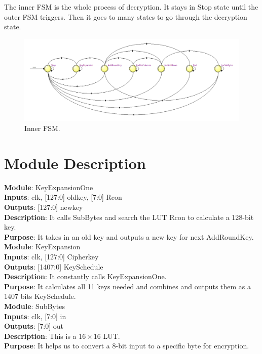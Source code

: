 \documentclass[12pt]{article}
\begin{document}
The inner FSM is the whole process of decryption. It stays in Stop state until the outer FSM triggers. Then it goes to many states to go through the decryption state. 
\begin{figure}[H]
    \centering
    \includegraphics[width=18cm]{FSM_inner.png}
    \caption{Inner FSM.}
\end{figure}

\section{Module Description}
\textbf{Module}: KeyExpansionOne \\ 
\textbf{Inputs}: clk, [127:0] oldkey, [7:0] Rcon \\ 
\textbf{Outputs}: [127:0] newkey \\
\textbf{Description}: It calls SubBytes and search the LUT Rcon to calculate a 128-bit key. \\ 
\textbf{Purpose}: It takes in an old key and outputs a new key for next AddRoundKey. \\

\textbf{Module}: KeyExpansion \\ 
\textbf{Inputs}: clk, [127:0] Cipherkey \\ 
\textbf{Outputs}: [1407:0] KeySchedule \\
\textbf{Description}: It constantly calls KeyExpansionOne. \\ 
\textbf{Purpose}: It calculates all 11 keys needed and combines and outputs them as a 1407 bits KeySchedule. \\

\textbf{Module}: SubBytes \\ 
\textbf{Inputs}: clk, [7:0] in \\ 
\textbf{Outputs}: [7:0] out \\
\textbf{Description}: This is a $16 \times 16$ LUT. \\ 
\textbf{Purpose}: It helps us to convert a 8-bit input to a specific byte for encryption. \\
\end{document}
